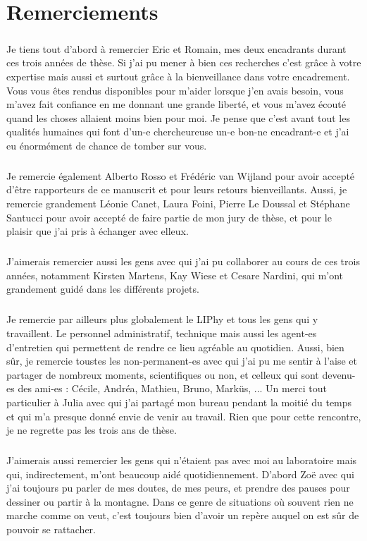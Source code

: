 \thispagestyle{empty}

\section*{Remerciements}

\small

\subparagraph{}Je tiens tout d'abord à remercier Eric et Romain, mes deux encadrants durant ces trois années de thèse. Si j'ai pu mener à bien ces recherches c'est grâce à votre expertise mais aussi et surtout grâce à la bienveillance dans votre encadrement. Vous vous êtes rendus disponibles pour m'aider lorsque j'en avais besoin, vous m'avez fait confiance en me donnant une grande liberté, et vous m'avez écouté quand les choses allaient moins bien pour moi. Je pense que c'est avant tout les qualités humaines qui font d'un-e chercheureuse un-e bon-ne encadrant-e et j'ai eu énormément de chance de tomber sur vous.

\subparagraph{}Je remercie également Alberto Rosso et Frédéric van Wijland pour avoir accepté d'être rapporteurs de ce manuscrit et pour leurs retours bienveillants. Aussi, je remercie grandement Léonie Canet, Laura Foini, Pierre Le Doussal et Stéphane Santucci pour avoir accepté de faire partie de mon jury de thèse, et pour le plaisir que j'ai pris à échanger avec elleux.

\subparagraph{}J'aimerais remercier aussi les gens avec qui j'ai pu collaborer au cours de ces trois années, notamment Kirsten Martens, Kay Wiese et Cesare Nardini, qui m'ont grandement guidé dans les différents projets.

\subparagraph{}Je remercie par ailleurs plus globalement le LIPhy et tous les gens qui y travaillent. Le personnel administratif, technique mais aussi les agent-es d'entretien qui permettent de rendre ce lieu agréable au quotidien. Aussi, bien sûr, je remercie toustes les non-permanent-es avec qui j'ai pu me sentir à l'aise et partager de nombreux moments, scientifiques ou non, et celleux qui sont devenu-es des ami-es : Cécile, Andréa, Mathieu, Bruno, Marküs, ... Un merci tout particulier à Julia avec qui j'ai partagé mon bureau pendant la moitié du temps et qui m'a presque donné envie de venir au travail. Rien que pour cette rencontre, je ne regrette pas les trois ans de thèse.

\subparagraph{}J'aimerais aussi remercier les gens qui n'étaient pas avec moi au laboratoire mais qui, indirectement, m'ont beaucoup aidé quotidiennement. D'abord Zoë avec qui j'ai toujours pu parler de mes doutes, de mes peurs, et prendre des pauses pour dessiner ou partir à la montagne. Dans ce genre de situations où souvent rien ne marche comme on veut, c'est toujours bien d'avoir un repère auquel on est sûr de pouvoir se rattacher.

